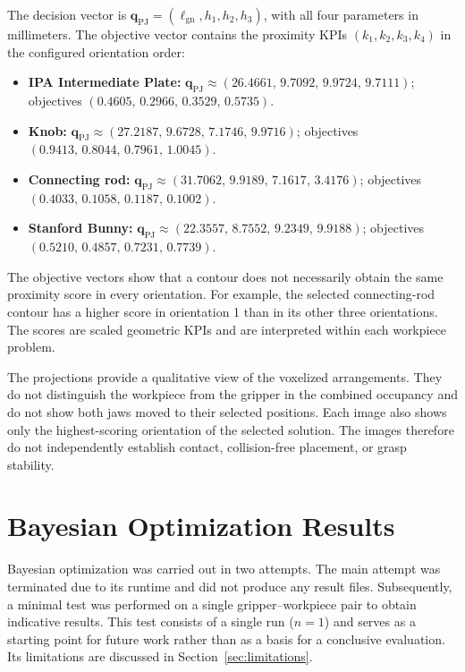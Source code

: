 The decision vector is
$\mathbf{q}_{\mathrm{PJ}}=(\ell_{\mathrm{gn}},h_1,h_2,h_3)$, with all
four parameters in millimeters. The objective vector contains the
proximity KPIs $(k_1,k_2,k_3,k_4)$ in the configured orientation order:

\begin{itemize}
    \item \textbf{IPA Intermediate Plate:}
    $\mathbf{q}_{\mathrm{PJ}}\approx
    (26.4661,\,9.7092,\,9.9724,\,9.7111)$;
    objectives $(0.4605,\,0.2966,\,0.3529,\,0.5735)$.

    \item \textbf{Knob:}
    $\mathbf{q}_{\mathrm{PJ}}\approx
    (27.2187,\,9.6728,\,7.1746,\,9.9716)$;
    objectives $(0.9413,\,0.8044,\,0.7961,\,1.0045)$.

    \item \textbf{Connecting rod:}
    $\mathbf{q}_{\mathrm{PJ}}\approx
    (31.7062,\,9.9189,\,7.1617,\,3.4176)$;
    objectives $(0.4033,\,0.1058,\,0.1187,\,0.1002)$.

    \item \textbf{Stanford Bunny:}
    $\mathbf{q}_{\mathrm{PJ}}\approx
    (22.3557,\,8.7552,\,9.2349,\,9.9188)$;
    objectives $(0.5210,\,0.4857,\,0.7231,\,0.7739)$.
\end{itemize}

The objective vectors show that a contour does not necessarily obtain
the same proximity score in every orientation. For example, the
selected connecting-rod contour has a higher score in orientation 1
than in its other three orientations. The scores are scaled geometric
KPIs and are interpreted within each workpiece problem.

The projections provide a qualitative view of the voxelized
arrangements. They do not distinguish the workpiece from the gripper
in the combined occupancy and do not show both jaws moved to their
selected positions. Each image also shows only the highest-scoring
orientation of the selected solution. The images therefore do not
independently establish contact, collision-free placement, or grasp
stability.

\section{Bayesian Optimization Results}
\label{sec:results_bayesian}

Bayesian optimization was carried out in two attempts. The main attempt was
terminated due to its runtime and did not produce any result files.
Subsequently, a minimal test was performed on a single gripper--workpiece pair
to obtain indicative results. This test consists of a single run ($n=1$) and
serves as a starting point for future work rather than as a basis for a
conclusive evaluation. Its limitations are discussed in
Section~\ref{sec:limitations}.

